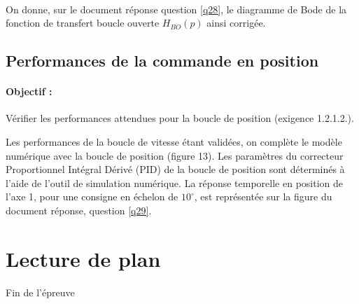 
~\

On donne, sur le document réponse question \ref{q28}, le diagramme de Bode de la fonction de transfert boucle ouverte $H_{BO}(p)$ ainsi corrigée.


\subsection{Performances de la commande en position}

\paragraph{Objectif :} Vérifier les performances attendues pour la boucle de position (exigence 1.2.1.2.). 

Les performances de la boucle de vitesse étant validées, on complète le modèle numérique avec la boucle de position (figure 13). Les paramètres du correcteur Proportionnel Intégral Dérivé (PID) de la boucle de position sont déterminés à l'aide de l'outil de simulation numérique. La réponse temporelle en position de l'axe 1, pour une consigne en échelon de $10^\circ$, est représentée sur la figure du document réponse, question \ref{q29}.


\section{Lecture de plan}


\vspace{2cm}

\begin{center}
\Huge{Fin de l'épreuve}
\end{center}

\newpage

